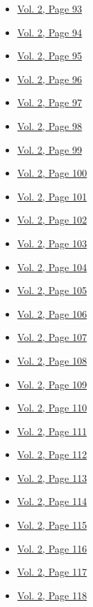\begin{itemize}
\begin{itemize}
  \item
    \protect\hyperlink{g-page-305}{Vol. 2, Page 93}
  \item
    \protect\hyperlink{g-page-306}{Vol. 2, Page 94}
  \item
    \protect\hyperlink{g-page-307}{Vol. 2, Page 95}
  \item
    \protect\hyperlink{g-page-308}{Vol. 2, Page 96}
  \item
    \protect\hyperlink{g-page-309}{Vol. 2, Page 97}
  \item
    \protect\hyperlink{g-page-310}{Vol. 2, Page 98}
  \item
    \protect\hyperlink{g-page-311}{Vol. 2, Page 99}
  \item
    \protect\hyperlink{g-page-312}{Vol. 2, Page 100}
  \item
    \protect\hyperlink{g-page-313}{Vol. 2, Page 101}
  \item
    \protect\hyperlink{g-page-314}{Vol. 2, Page 102}
  \item
    \protect\hyperlink{g-page-315}{Vol. 2, Page 103}
  \item
    \protect\hyperlink{g-page-316}{Vol. 2, Page 104}
  \item
    \protect\hyperlink{g-page-317}{Vol. 2, Page 105}
  \item
    \protect\hyperlink{g-page-318}{Vol. 2, Page 106}
  \item
    \protect\hyperlink{g-page-319}{Vol. 2, Page 107}
  \item
    \protect\hyperlink{g-page-320}{Vol. 2, Page 108}
  \item
    \protect\hyperlink{g-page-321}{Vol. 2, Page 109}
  \item
    \protect\hyperlink{g-page-322}{Vol. 2, Page 110}
  \item
    \protect\hyperlink{g-page-323}{Vol. 2, Page 111}
  \item
    \protect\hyperlink{g-page-324}{Vol. 2, Page 112}
  \item
    \protect\hyperlink{g-page-325}{Vol. 2, Page 113}
  \item
    \protect\hyperlink{g-page-326}{Vol. 2, Page 114}
  \item
    \protect\hyperlink{g-page-327}{Vol. 2, Page 115}
  \item
    \protect\hyperlink{g-page-328}{Vol. 2, Page 116}
  \item
    \protect\hyperlink{g-page-329}{Vol. 2, Page 117}
  \item
    \protect\hyperlink{g-page-330}{Vol. 2, Page 118}

\end{itemize}
\end{itemize}
